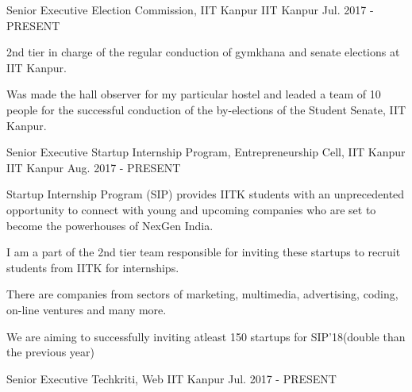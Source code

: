\begin{cventries}
  \cventry
    {Senior Executive}
    {Election Commission, IIT Kanpur}
    {IIT Kanpur}
    {Jul. 2017 - PRESENT}
    {
      \begin{cvitems}
        \item {2nd tier in charge of the regular conduction of gymkhana and senate elections at IIT Kanpur.}
        \item {Was made the hall observer for my particular hostel and leaded a team of 10 people for the successful conduction of the by-elections of the Student Senate, IIT Kanpur.}
      \end{cvitems}
    }
  \cventry
    {Senior Executive}
    {Startup Internship Program, Entrepreneurship Cell, IIT Kanpur}
    {IIT Kanpur}
    {Aug. 2017 - PRESENT}
    {
      \begin{cvitems}
        \item {Startup Internship Program (SIP) provides IITK students with an unprecedented opportunity to connect with young and upcoming companies who are set to become the powerhouses of NexGen India.}
        \item {I am a part of the 2nd tier team responsible for inviting these startups to recruit students from IITK for internships. }
        \item {There are companies from sectors of marketing, multimedia, advertising, coding, on-line ventures and many more.}
        \item {We are aiming to successfully inviting atleast 150 startups for SIP'18(double than the previous year)}
      \end{cvitems}
    }
  \cventry
    {Senior Executive}
    {Techkriti, Web}
    {IIT Kanpur}
    {Jul. 2017 - PRESENT}
    {
    }
\end{cventries}
